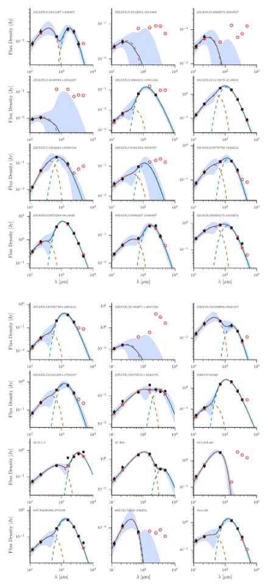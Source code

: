 \begin{figure}
\centering
\includegraphics[width=\textwidth]{figures/sedfig4}
\caption{}
\end{figure}

\begin{figure}
\centering
\includegraphics[width=\textwidth]{figures/sedfig5}
\caption{}
\end{figure}

